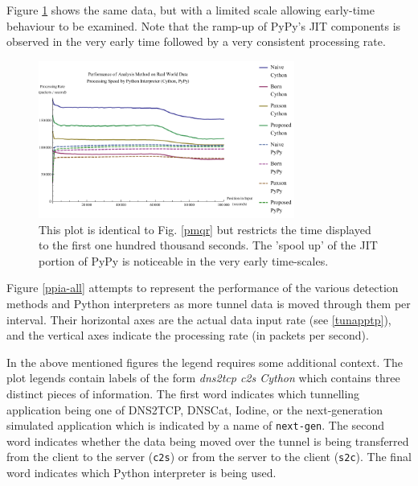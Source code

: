 \documentclass{llncs}
\begin{document}
Figure \ref{pmqr-100k} shows the same data, but with a limited scale allowing
early-time behaviour to be examined. Note that the ramp-up of PyPy's JIT
components is observed in the very early time followed by a very consistent
processing rate.

\begin{figure}
\centering
\includegraphics[width=0.75\textwidth]{../figures/pmqr-100k.pdf}
\caption[Performance of Analysis Method and Python Interpreter on Real World
Data - Early Time]{This plot is identical to Fig. \ref{pmqr} but restricts the time
displayed to the first one hundred thousand seconds. The 'spool up' of the JIT
portion of PyPy is noticeable in the very early time-scales.}
\label{pmqr-100k}
\end{figure}


Figure \ref{ppia-all} attempts
to represent the performance of the various
detection methods and Python interpreters as more tunnel data is moved through
them per interval. Their horizontal axes are the actual data input rate (see \ref{tunapptp}), and the vertical axes indicate the
processing rate (in packets per second).

In the above mentioned figures the legend requires some additional context. The
plot legends contain labels of the form \emph{dns2tcp c2s Cython} which contains
three distinct pieces of information. The first word indicates which tunnelling
application being one of DNS2TCP, DNSCat, Iodine, or the next-generation simulated application which is indicated by a name of \texttt{next-gen}. The
second word indicates whether the data being moved over the tunnel is being
transferred from the client to the server (\texttt{c2s}) or from the server to
the client (\texttt{s2c}). The final word indicates which Python interpreter is
being used.
\end{document}
